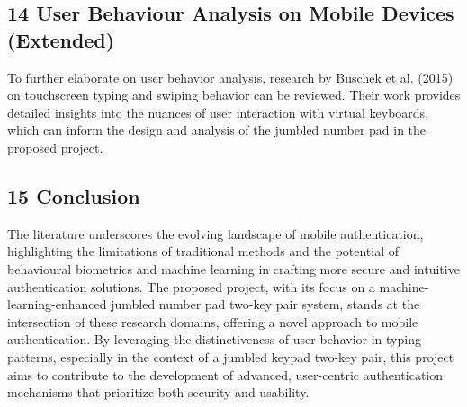 \documentclass{article}
\begin{document}
\subsection*{14 User Behaviour Analysis on Mobile Devices (Extended)}

To further elaborate on user behavior analysis, research by Buschek et al. (2015) on touchscreen typing and swiping behavior can be reviewed. Their work provides detailed insights into the nuances of user interaction with virtual keyboards, which can inform the design and analysis of the jumbled number pad in the proposed project.

\subsection*{15 Conclusion}

The literature underscores the evolving landscape of mobile authentication, highlighting the limitations of traditional methods and the potential of behavioural biometrics and machine learning in crafting more secure and intuitive authentication solutions. The proposed project, with its focus on a machine-learning-enhanced jumbled number pad two-key pair system, stands at the intersection of these research domains, offering a novel approach to mobile authentication. By leveraging the distinctiveness of user behavior in typing patterns, especially in the context of a jumbled keypad two-key pair, this project aims to contribute to the development of advanced, user-centric authentication mechanisms that prioritize both security and usability.
\end{document}
